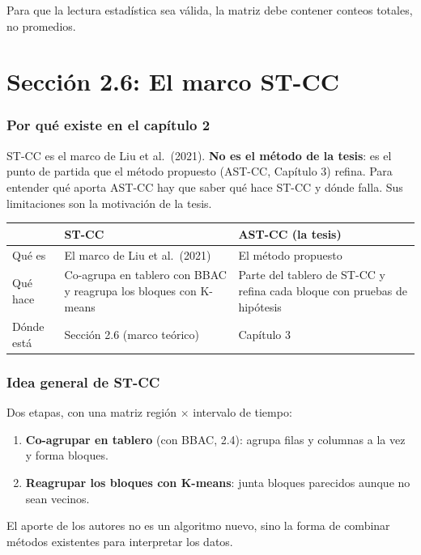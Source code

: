 \documentclass[11pt,a4paper]{article}
\newenvironment{idea}{\par\begin{center}\begin{lrbox}{\ideabox}\begin{minipage}{0.9\linewidth}}{\end{minipage}\end{lrbox}\fcolorbox{blue!40!black}{blue!5}{\usebox{\ideabox}}\end{center}}
\begin{document}
\begin{idea}
Para que la lectura estadística sea válida, la matriz debe contener conteos
totales, no promedios.
\end{idea}

\part{Sección 2.6: El marco ST-CC}

\section{Por qué existe en el capítulo 2}

ST-CC es el marco de Liu et al.\ (2021). \textbf{No es el método de la tesis}: es
el punto de partida que el método propuesto (AST-CC, Capítulo 3) refina. Para
entender qué aporta AST-CC hay que saber qué hace ST-CC y dónde falla. Sus
limitaciones son la motivación de la tesis.

\begin{center}
\renewcommand{\arraystretch}{1.3}
\begin{tabular}{@{}l>{\raggedright\arraybackslash}p{5.4cm}>{\raggedright\arraybackslash}p{4.6cm}@{}}
\toprule
 & \textbf{ST-CC} & \textbf{AST-CC (la tesis)} \\
\midrule
Qué es & El marco de Liu et al.\ (2021) & El método propuesto \\
\midrule
Qué hace & Co-agrupa en tablero con BBAC y reagrupa los bloques con K-means & Parte del tablero de ST-CC y refina cada bloque con pruebas de hipótesis \\
\midrule
Dónde está & Sección 2.6 (marco teórico) & Capítulo 3 \\
\bottomrule
\end{tabular}
\end{center}

\section{Idea general de ST-CC}

Dos etapas, con una matriz región $\times$ intervalo de tiempo:
\begin{enumerate}
  \item \textbf{Co-agrupar en tablero} (con BBAC, 2.4): agrupa filas y columnas a la
  vez y forma bloques.
  \item \textbf{Reagrupar los bloques con K-means}: junta bloques parecidos aunque
  no sean vecinos.
\end{enumerate}
El aporte de los autores no es un algoritmo nuevo, sino la forma de combinar
métodos existentes para interpretar los datos.
\end{document}
